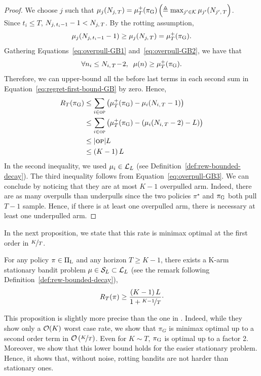 \begin{proof}
We choose $j$ such that $ \mu_j(N_{j,\,T}) = \mu^+_T(\pi_{\rm G}) \left(\triangleq \max_{j'\in \mathcal{K}} \mu_{j'}(N_{j',\,T}\right)$. \\Since $t_i \leq T$, $N_{j,\,t_i-1} - 1 < N_{j,\,T}$. By the rotting assumption, 
\begin{equation}
\label{eq:overpull-GB2}
 \mu_j(N_{j,\,t_i-1} - 1) \geq \mu_j(N_{j,\,T}) = \mu^+_T(\pi_{\rm G}).
\end{equation}
%
Gathering Equations~\ref{eq:overpull-GB1} and~\ref{eq:overpull-GB2}, we have that 
\begin{equation}
\label{eq:overpull-GB3}
\forall n_i \leq N_{i,\,T} \!-\! 2, \;\;  \mu(n) \geq \mu^+_T(\pi_{\rm G}).
\end{equation}
Therefore,  we can upper-bound all the before last terms in each second sum in Equation~\ref{eq:regret-first-bound-GB} by zero. Hence, 
\begin{align*}
R_T(\pi_{\rm G}) &\leq \sum_{i\in \textsc{op}} \left(\mu^+_T(\pi_{\rm G}) - \mu_i(N_{i,\,T}-1)\right)\\
&\leq \sum_{i\in \textsc{op}} \left(\mu^+_T(\pi_{\rm G}) - \left(\mu_i(N_{i,\,T}-2) - L\right)\right)\\
&\leq |\textsc{op}| L \\
&\leq \left(K-1\right) L
\end{align*}
In the second inequality, we used $\mu_i \in \mathcal{L}_L$ (see Definition~\ref{def:rew-bounded-decay}). The third inequality follows from Equation~\ref{eq:overpull-GB3}. We can conclude by noticing that they are at most $K-1$ overpulled arm. Indeed, there are as many overpulls than underpulls since the two policies $\pi^\star$ and $\pi_{\rm G}$ both pull $T-1$ sample. Hence, if there is at least one overpulled arm, there is necessary at least one underpulled arm. 
\end{proof}

In the next proposition, we state that this rate is minimax optimal at the first order in $\nicefrac{K}{T}$.

\begin{proposition}
\label{prop:lb-noisefree}
For any policy $\pi\in \Pi_{\rm L}$ and any horizon $T \geq K-1$, there exists a K-arm stationary bandit problem $\mu \in \mathcal{S}_L \subset \mathcal{L}_L$ (see the remark following Definition~\ref{def:rew-bounded-decay}), 
\[R_T (\pi) \geq \frac{\left(K-1\right)L}{1+ \nicefrac{K-1}{T}}\cdot\]
\end{proposition}
This proposition is slightly more precise than the one in \citet{heidari2016tight}. Indeed, while they show only a $\mathcal{O}(K)$ worst case rate, we show that $\pi_G$ is minimax optimal up to a second order term in $\mathcal{O}\left(\nicefrac{K}{T}\right)$. Even for $K\sim T$, $\pi_{\rm G}$ is optimal up to a factor 2. Moreover, we show that this lower bound holds for the easier stationary problem. Hence, it shows that, without noise, rotting bandits are not harder than stationary ones.


